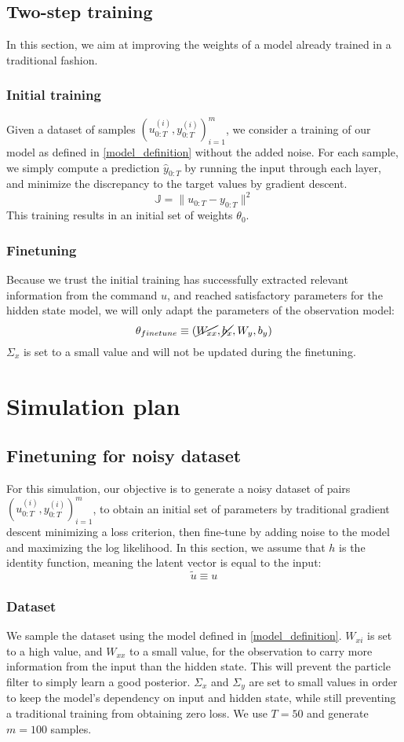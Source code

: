 \documentclass[10pt,a4paper]{report}
\begin{document}
\section{Two-step training}
In this section, we aim at improving the weights of a model already trained in a traditional fashion.

\subsection{Initial training}
\label{sec:pretrain}
Given a dataset of samples $(u_{0:T}^{(i)}, y_{0:T}^{(i)})_{i=1}^m$, we consider a training of our model as defined in \ref{model_definition} without the added noise.
For each sample, we simply compute a prediction $\hat y_{0:T}$ by running the input through each layer, and minimize the discrepancy to the target values by gradient descent.
$$
        \mathbb{J} = \| u_{0:T} - y_{0:T} \|^2
$$
This training results in an initial set of weights $\theta_0$.

\subsection{Finetuning}
Because we trust the initial training has successfully extracted relevant information from the command $u$, and reached satisfactory parameters for the hidden state model, we will only adapt the parameters of the observation model:
$$
        \theta_{finetune} \equiv (\cancel{W_{xx}}, \cancel{b_x}, W_y, b_y)
$$
$\Sigma_x$ is set to a small value and will not be updated during the finetuning.

\chapter{Simulation plan}
\section{Finetuning for noisy dataset}
For this simulation, our objective is to generate a noisy dataset of pairs $(u_{0:T}^{(i)}, y_{0:T}^{(i)})_{i=1}^m$, to obtain an initial set of parameters by traditional gradient descent minimizing a loss criterion, then fine-tune by adding noise to the model and maximizing the log likelihood.
In this section, we assume that $h$ is the identity function, meaning the latent vector is equal to the input:
$$
        \tilde u \equiv u
$$

\subsection{Dataset}
We sample the dataset using the model defined in \ref{model_definition}.
$W_{xi}$ is set to a high value, and $W_{xx}$ to a small value, for the observation to carry more information from the input than the hidden state.
This will prevent the particle filter to simply learn a good posterior.
$\Sigma_x$ and $\Sigma_y$ are set to small values in order to keep the model's dependency on input and hidden state, while still preventing a traditional training from obtaining zero loss.
We use $T=50$ and generate $m=100$ samples.
\end{document}

